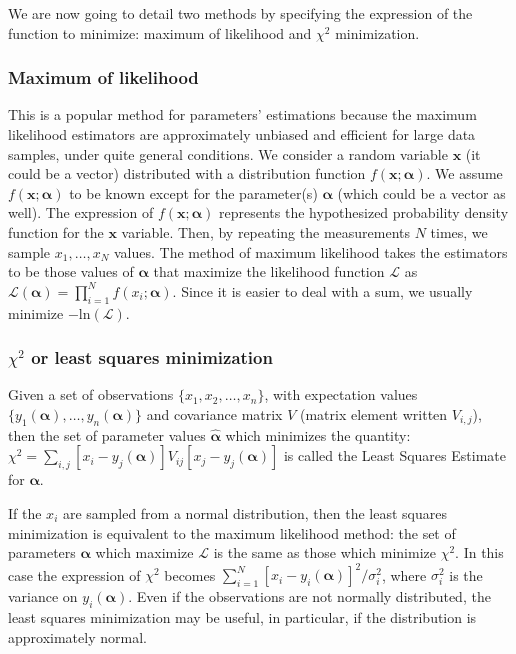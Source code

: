 We are now going to detail two methods by specifying the expression of
the function to minimize: maximum of likelihood and $\chi^2$ minimization.

\subsubsection{Maximum of likelihood}
This is a popular method for parameters' estimations because the maximum likelihood estimators are approximately
unbiased and efficient for large data samples, under quite general
conditions.
We consider a random variable $\mathbf{x}$ (it could be a vector) distributed
with a distribution function $f(\mathbf{x}; \mathbf{\alpha})$. We assume $f(\mathbf{x}; \mathbf{\alpha})$
to be known except for the parameter(s) $\mathbf{\alpha}$ (which could
be a vector as well). The expression of $f(\mathbf{x};\mathbf{\alpha})$ represents the
hypothesized probability density function for the $\mathbf{x}$ variable. Then,
by repeating the measurements $N$ times, we sample $x_1,\ldots, x_N$
values. The method of maximum likelihood takes the estimators to be
those values of $\mathbf{\alpha}$ that maximize the likelihood function $\mathcal{L}$ as
$\mathcal{L}(\mathbf{\alpha})=\prod_{i=1}^N f(x_i;\mathbf{\alpha})$.
Since it is easier to deal with a sum, we usually minimize
$-\text{ln}(\mathcal{L})$.

\subsubsection{$\chi^2$ or least squares minimization}
Given a set of observations $\{x_1, x_2, \ldots, x_n\}$, with expectation values
$\{y_1(\mathbf{\alpha}),\ldots,
y_n(\mathbf{\alpha})\}$ and covariance matrix $V$ (matrix element
written $V_{i,j}$), then the set of
parameter values $\hat{\mathbf{\alpha}}$ which minimizes the quantity:
$\chi^2=\sum_{i,j} [x_i-y_j(\mathbf{\alpha})]V_{ij}[x_j-y_j(\mathbf{\alpha})]$ is called
the Least Squares Estimate for $\mathbf{\alpha}$.

If the $x_i$ are sampled from a normal distribution, then the least
squares minimization is equivalent to the maximum likelihood method:
the set of parameters $\mathbf{\alpha}$ which maximize $\mathcal{L}$ is the
same as those which minimize $\chi^2$. In this case the expression of
$\chi^2$ becomes $\sum_{i=1} ^N
[x_i-y_i(\mathbf{\alpha})]^2/\sigma_i^2$, where $\sigma_i^2$ is the
variance on $y_i (\mathbf{\alpha})$. Even if the observations are
not normally distributed, the least
squares minimization may be useful, in particular, if the distribution is approximately normal. 


